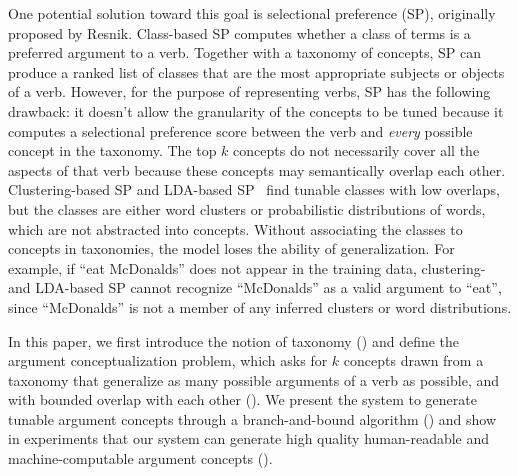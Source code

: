 One potential solution toward this goal is selectional preference
(SP), originally proposed by Resnik.
Class-based SP computes whether a class of terms is a preferred argument
to a verb. Together with a taxonomy of concepts,
SP can produce a ranked list of classes that are the most appropriate
subjects or objects of a verb. However, for the purpose of representing verbs,
SP has the following drawback: it doesn't allow the granularity of the concepts
to be tuned because it computes a selectional preference score between the
verb and {\em every} possible concept in the taxonomy. The top $k$ concepts
do not necessarily cover all the aspects of that verb because these
concepts may semantically overlap each other.
Clustering-based SP and LDA-based SP~\cite{ritter2010latent}
find tunable classes with low overlaps, but the classes are either
word clusters or probabilistic distributions of words,
which are not abstracted into concepts. Without
associating the classes to concepts in taxonomies,
the model loses the ability of generalization.
For example, if ``eat McDonalds'' does not appear in the training
data, clustering- and LDA-based SP cannot recognize ``McDonalds''
as a valid argument to ``eat'', since ``McDonalds'' is not
a member of any inferred clusters or word distributions.

In this paper, we first introduce the notion of taxonomy ()
and define the argument conceptualization problem,
which asks for $k$ concepts drawn from a taxonomy
that generalize as many possible arguments
of a verb as possible, and with bounded overlap with each other
(). We present the system
to generate tunable argument concepts through a branch-and-bound
algorithm () and show in experiments that our system can
generate high quality human-readable and machine-computable
argument concepts ().
